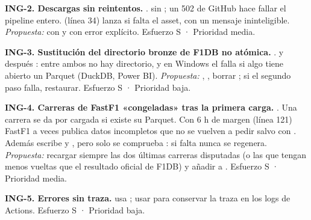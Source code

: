 \textbf{ING-2. Descargas sin reintentos.} .  sin ; un 502 de GitHub hace fallar el pipeline entero.  (línea 34) lanza  si falta el asset, con un mensaje ininteligible. \emph{Propuesta:}  con  y  con error explícito. Esfuerzo S · Prioridad media.

\textbf{ING-3. Sustitución del directorio bronze de F1DB no atómica.} .  y después : entre ambos no hay directorio, y en Windows el  falla si algo tiene abierto un Parquet (DuckDB, Power BI). \emph{Propuesta:} , , borrar ; si el segundo paso falla, restaurar. Esfuerzo S · Prioridad baja.

\textbf{ING-4. Carreras de FastF1 «congeladas» tras la primera carga.} . Una carrera se da por cargada si existe su Parquet. Con 6 h de margen (línea 121) FastF1 a veces publica datos incompletos que no se vuelven a pedir salvo con . Además  escribe  y , pero solo se comprueba : si falta  nunca se regenera. \emph{Propuesta:} recargar siempre las dos últimas carreras disputadas (o las que tengan menos vueltas que el resultado oficial de F1DB) y añadir  a . Esfuerzo S · Prioridad media.

\textbf{ING-5. Errores sin traza.}  usa ; usar  para conservar la traza en los logs de Actions. Esfuerzo S · Prioridad baja.

